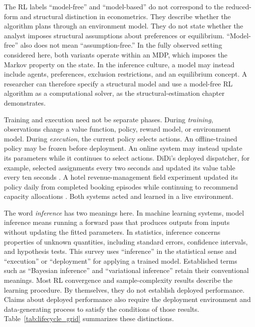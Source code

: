 The RL labels ``model-free'' and ``model-based'' do not correspond to the reduced-form and structural distinction in econometrics. They describe whether the algorithm plans through an environment model. They do not state whether the analyst imposes structural assumptions about preferences or equilibrium. ``Model-free'' also does not mean ``assumption-free.'' In the fully observed setting considered here, both variants operate within an MDP, which imposes the Markov property on the state. In the inference culture, a model may instead include agents, preferences, exclusion restrictions, and an equilibrium concept. A researcher can therefore specify a structural model and use a model-free RL algorithm as a computational solver, as the structural-estimation chapter demonstrates.

Training and execution need not be separate phases. During \emph{training}, observations change a value function, policy, reward model, or environment model. During \emph{execution}, the current policy selects actions. An offline-trained policy may be frozen before deployment. An online system may instead update its parameters while it continues to select actions. DiDi's deployed dispatcher, for example, selected assignments every two seconds and updated its value table every ten seconds \citep{SadeghiEshkevari2022DiDiScalable}. A hotel revenue-management field experiment updated its policy daily from completed booking episodes while continuing to recommend capacity allocations \citep{Chen2023hotelrl}. Both systems acted and learned in a live environment.

The word \emph{inference} has two meanings here. In machine learning systems, model inference means running a forward pass that produces outputs from inputs without updating the fitted parameters. In statistics, inference concerns properties of unknown quantities, including standard errors, confidence intervals, and hypothesis tests. This survey uses ``inference'' in the statistical sense and ``execution'' or ``deployment'' for applying a trained model. Established terms such as ``Bayesian inference'' and ``variational inference'' retain their conventional meanings. Most RL convergence and sample-complexity results describe the learning procedure. By themselves, they do not establish deployed performance. Claims about deployed performance also require the deployment environment and data-generating process to satisfy the conditions of those results. Table~\ref{tab:lifecycle_grid} summarizes these distinctions.

